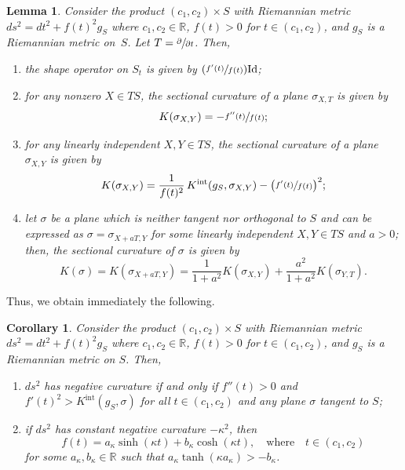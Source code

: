 \documentclass[JEP,XML,SOM,Unicode,NoFloatCountersInSection]{cedram}
\newcommand{\Psfrac}[2]{(\sfrac{#1}{#2})}
\newcommand{\Int}{\mathrm{int}}
\newtheorem{lemma}[theorem]{Lemma}
\newtheorem{corollary}[theorem]{Corollary}
\theoremstyle{definition}
\renewcommand{\>}{{\rangle}}
\newcommand{\<}{{\langle}}
\begin{document}
\begin{lemma}\label{lemma: curvature for product}
Consider the product $(c_1,c_2)\times S$ with Riemannian metric $ds^2 = dt^2+f(t)^2g_S$ where $c_1,c_2\in\mathbb R$, $f(t)>0$ for $t\in(c_1,c_2)$, and $g_S$ is a Riemannian metric on~$S$. Let $T = \sfrac{\partial}{\partial t}$. Then,
\begin{enumerate}
\item \label{eigenvalues for product} the shape operator on $S_t$ is given by $\Psfrac{f'(t)}{f(t)}\textup{Id}$;
\item\label{normal for product} for any nonzero $X\in TS$, the sectional curvature of a plane $\sigma_{X,T}$ is given by\vspace*{-3pt}
\begin{equation*}
K(\sigma_{X,Y}) = -\sfrac{f''(t)}{f(t)};
\end{equation*}
\item\label{level for product} for any linearly independent $X,Y\in TS$, the sectional curvature of a plane $\sigma_{X,Y}$ is given by\vspace*{-3pt}
\begin{equation*}
K(\sigma_{X,Y}) = \frac{1}{f(t)^2}\,K^{\Int}(g_S, \sigma_{X,Y})-\bigl(\sfrac{f'(t)}{f(t)}\bigr)^2;
\end{equation*}
\item\label{all for product} let $\sigma$ be a plane which is neither tangent nor orthogonal to $S$ and can be expressed as $\sigma=\sigma_{X+aT, Y}$ for some linearly independent $X,Y\in TS$ and $a>0$; then, the sectional curvature of $\sigma$ is given by\vspace*{-3pt}
\begin{equation*}
K(\sigma)=K(\sigma_{X+aT, Y}) = \frac{1}{1+a^2}K(\sigma_{X,Y})+\frac{a^2}{1+a^2}K(\sigma_{Y,T}).
\end{equation*}
\end{enumerate}
\end{lemma}

Thus, we obtain immediately the following.

\begin{corollary}
Consider the product $(c_1,c_2)\times S$ with Riemannian metric $ds^2 = dt^2+f(t)^2g_S$ where $c_1,c_2\in\mathbb R$, $f(t)>0$ for $t\in(c_1,c_2)$, and $g_S$ is a Riemannian metric on $S$. Then,
\begin{enumerate}
\item $ds^2$ has negative curvature if and only if $f''(t)>0$ and $f'(t)^2>K^{\Int}(g_S,\sigma)$ for all $t\in(c_1,c_2)$ and any plane $\sigma$ tangent to $S$;
\item if $ds^2$ has constant negative curvature $-\kappa^2$, then
\begin{equation*}
f(t)=a_\kappa\sinh(\kappa t)+b_\kappa\cosh(\kappa t), \quad \text{where}\quad t\in(c_1,c_2)
\end{equation*}
for some $a_\kappa,b_\kappa\in \mathbb R$ such that $a_\kappa\tanh(\kappa a_\kappa)>-b_\kappa$.
\end{enumerate}
\end{corollary}
\end{document}
